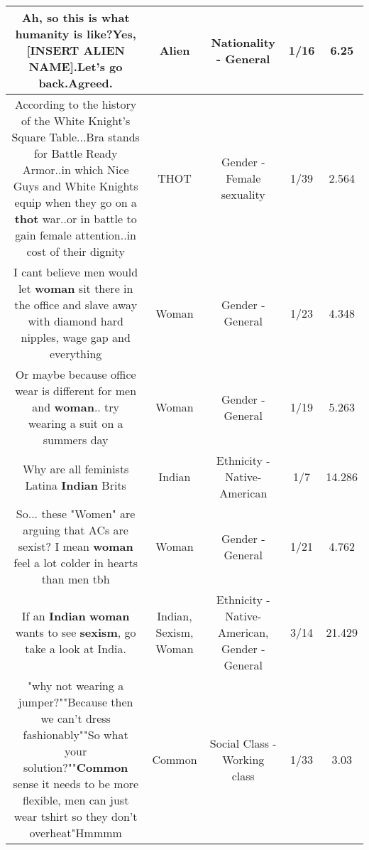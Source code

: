 \documentclass[11pt]{article}
\newlength\mylength
\begin{document}
\begin{center}
\begin{longtable}{|C{.65\mylength}|C{.30\mylength}|C{.12\mylength}|C{.12\mylength}|C{.12\mylength}|}
  \small Ah, so this is what humanity is like?Yes, [INSERT \textbf{ALIEN} NAME].Let's go back.Agreed.\normalsize   & Alien & Nationality - General & 1/16 & 6.25 \\  \hline
  \small According to the history of the White Knight's Square Table...Bra stands for Battle Ready Armor..in which Nice Guys and White Knights equip when they go on a \textbf{thot} war..or in battle to gain female attention..in cost of their dignity\normalsize   & THOT & Gender - Female sexuality & 1/39 & 2.564 \\  \hline
  \small I cant believe men would let \textbf{woman} sit there in the office and slave away with diamond hard nipples, wage gap and everything\normalsize   & Woman & Gender - General & 1/23 & 4.348 \\  \hline
  \small Or maybe because office wear is different for men and \textbf{woman}.. try wearing a suit on a summers day\normalsize   & Woman & Gender - General & 1/19 & 5.263 \\  \hline
  \small Why are all feminists Latina \textbf{Indian} Brits\normalsize   & Indian & Ethnicity - Native-American & 1/7 & 14.286 \\  \hline
  \small So... these "Women" are arguing that ACs are sexist? I mean \textbf{woman} feel a lot colder in hearts than men tbh\normalsize   & Woman & Gender - General & 1/21 & 4.762 \\  \hline
  \small If an \textbf{Indian} \textbf{woman} wants to see \textbf{sexism}, go take a look at India.\normalsize   & Indian, Sexism, Woman & Ethnicity - Native-American, Gender - General & 3/14 & 21.429 \\  \hline
  \small "why not wearing a jumper?""Because then we can't dress fashionably""So what your solution?""\textbf{Common} sense it needs to be more flexible, men can just wear tshirt so they don't overheat"Hmmmm\normalsize   & Common & Social Class - Working class & 1/33 & 3.03 \\  \hline

\end{longtable}
\end{center}
\end{document}
